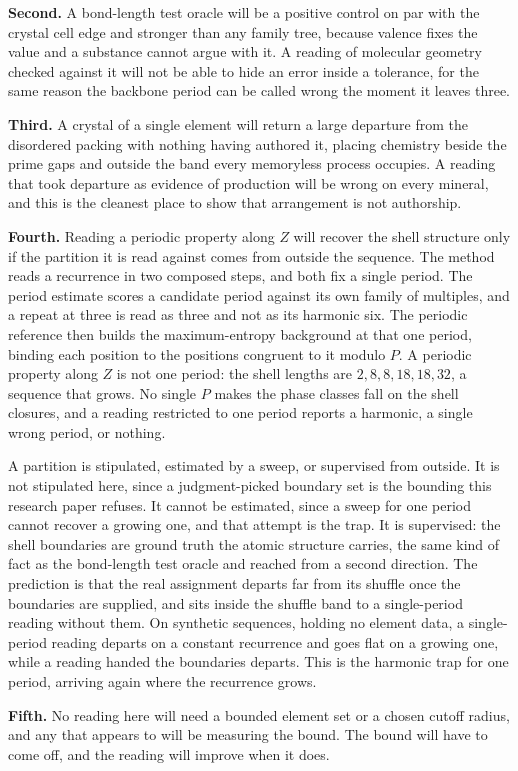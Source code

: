 \textbf{Second.} A bond-length test oracle will be a positive control on par with the crystal cell
edge and stronger than any family tree, because valence fixes the value and a substance cannot argue
with it. A reading of molecular geometry checked against it will not be able to hide an error inside
a tolerance, for the same reason the backbone period can be called wrong the moment it leaves three.

\textbf{Third.} A crystal of a single element will return a large departure from the disordered
packing with nothing having authored it, placing chemistry beside the prime gaps and outside the band
every memoryless process occupies. A reading that took departure as evidence of production will be
wrong on every mineral, and this is the cleanest place to show that arrangement is not authorship.

\textbf{Fourth.} Reading a periodic property along \(Z\) will recover the shell structure only if the
partition it is read against comes from outside the sequence. The method reads a recurrence in two
composed steps, and both fix a single period. The period estimate scores a candidate period against
its own family of multiples, and a repeat at three is read as three and not as its harmonic six. The
periodic reference then builds the maximum-entropy background at that one period, binding each
position to the positions congruent to it modulo \(P\). A periodic property along \(Z\) is not one
period: the shell lengths are \(2, 8, 8, 18, 18, 32\), a sequence that grows. No single \(P\) makes the
phase classes fall on the shell closures, and a reading restricted to one period reports a harmonic,
a single wrong period, or nothing.

A partition is stipulated, estimated by a sweep, or supervised from outside. It is not stipulated
here, since a judgment-picked boundary set is the bounding this research paper refuses. It cannot be
estimated, since a sweep for one period cannot recover a growing one, and that attempt is the trap.
It is supervised: the shell boundaries are ground truth the atomic structure carries, the same kind
of fact as the bond-length test oracle and reached from a second direction. The prediction is that
the real assignment departs far from its shuffle once the boundaries are supplied, and sits inside
the shuffle band to a single-period reading without them. On synthetic sequences, holding no element
data, a single-period reading departs on a constant recurrence and goes flat on a growing one, while
a reading handed the boundaries departs. This is the harmonic trap for one period, arriving again
where the recurrence grows.

\textbf{Fifth.} No reading here will need a bounded element set or a chosen cutoff radius, and any
that appears to will be measuring the bound. The bound will have to come off, and the reading will
improve when it does.
